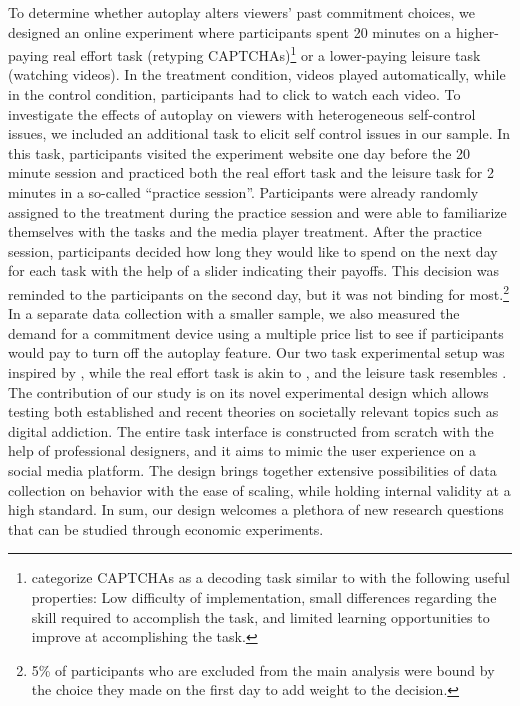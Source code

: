 \documentclass[11pt,a4paper,oneside]{article}
\begin{document}
To determine whether autoplay alters viewers' past commitment choices, we designed an online experiment where participants spent 20 minutes on a higher-paying real effort task (retyping CAPTCHAs)\footnote{\citet{charness2018experimental} categorize CAPTCHAs as a decoding task similar to \citet{augenblick2015working} with the following useful properties: Low difficulty of implementation, small differences regarding the skill required to accomplish the task, and limited learning opportunities to improve at accomplishing the task.} or a lower-paying leisure task (watching videos). In the treatment condition, videos played automatically, while in the control condition, participants had to click to watch each video. To investigate the effects of autoplay on viewers with heterogeneous self-control issues, we included an additional task to elicit self control issues in our sample. In this task, participants visited the experiment website one day before the 20 minute session and practiced both the real effort task and the leisure task for 2 minutes in a so-called ``practice session''. Participants were already randomly assigned to the treatment during the practice session and were able to familiarize themselves with the tasks and the media player treatment. After the practice session, participants decided how long they would like to spend on the next day for each task with the help of a slider indicating their payoffs. This decision was reminded to the participants on the second day, but it was not binding for most.\footnote{5\% of participants who are excluded from the main analysis were bound by the choice they made on the first day to add weight to the decision.} In a separate data collection with a smaller sample, we also measured the demand for a commitment device using a multiple price list to see if participants would pay to turn off the autoplay feature. Our two task experimental setup was inspired by \citet{kool2014labor}, while the real effort task is akin to \citet{augenblick2015working}, and the leisure task resembles  \citet{bonein2015self}. The contribution of our study is on its novel experimental design which allows testing both established and recent theories on societally relevant topics such as digital addiction. The entire task interface is constructed from scratch with the help of professional designers, and it aims to mimic the user experience on a social media platform. The design brings together extensive possibilities of data collection on behavior with the ease of scaling, while holding internal validity at a high standard. In sum, our design welcomes a plethora of new research questions that can be studied through economic experiments.
\end{document}
